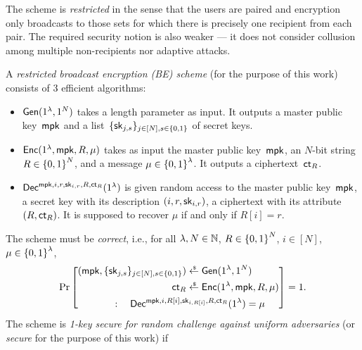 The scheme is \emph{restricted} in the sense that the users are paired and encryption only broadcasts to those sets for which there is precisely one recipient from each pair.
The required security notion is also weaker --- it does not consider collusion among multiple non-recipients nor adaptive attacks.

\begin{definition}
A \emph{restricted broadcast encryption (BE) scheme} (for the purpose of this work) consists of 3 efficient algorithms:
\begin{itemize}
\item $\Gen(1^\lambda,1^N)$ takes a length parameter as input.
It outputs a master public key~$\mpk$ and
a list~$\{\sk_{j,s}\}_{j\in[N],s\in\bit}$ of secret keys.
\item $\Enc(1^\lambda,\mpk,R,\mu)$ takes as input
the master public key~$\mpk$,
an $N$-bit string ${R\in{\{0,1\}}^N}$, and
a message ${\mu\in{\{0,1\}}^\lambda}$.
It outputs a ciphertext~$\ct_R$.
\item $\Dec^{\mpk,i,r,\sk_{i,r},R,\ct_R}(1^\lambda)$
is given random access to
the master public key~$\mpk$,
a secret key with its description $(i,r,\sk_{i,r})$,
a ciphertext with its attribute $(R,\ct_R)$.
It is supposed to recover $\mu$ if and only if ${R[i]=r}$.
\end{itemize}
The scheme must be \emph{correct}, i.e., for all
${\lambda,N\in{\mathbb{N}}}$,
${R\in{\{0,1\}}^N}$,
${i\in[N]}$,
${\mu\in{\{0,1\}}^\lambda}$,
\begin{align*}
\Pr\left[\begin{aligned}
(\mpk,\{\sk_{j,s}\}_{j\in[N],s\in\bit})
&{}
\draws\Gen(1^\lambda,1^N)
\\
\ct_R
&{}
\draws\Enc(1^\lambda,\mpk,R,\mu)
\\
:\quad
\Dec^{\mpk,i,R[i],\sk_{i,R[i]},R,\ct_R}
(1^\lambda)=\mu
\hspace*{-8em}
&
\end{aligned}
\right]
=1.
\end{align*}
The scheme is \emph{1-key secure for random challenge against uniform adversaries} (or \emph{secure} for the purpose of this work) if
\begin{align*}

\end{align*}
\end{definition}
